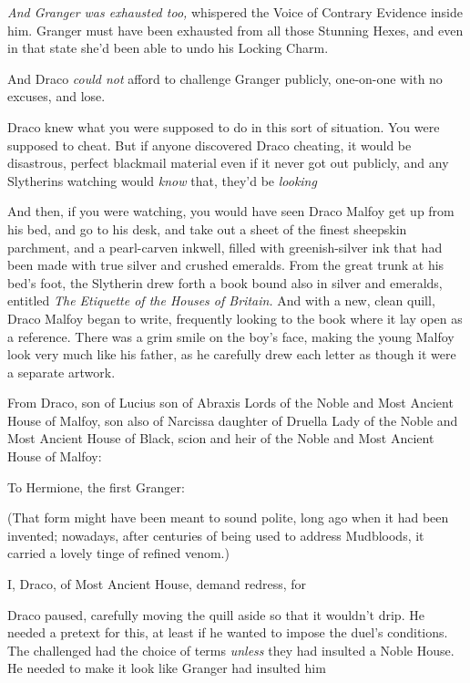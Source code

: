\emph{And Granger was exhausted too,} whispered the Voice of Contrary Evidence
inside him. Granger must have been exhausted from all those Stunning Hexes, and
even in that state she'd been able to undo his Locking Charm.

And Draco \emph{could not} afford to challenge Granger publicly, one-on-one
with no excuses, and lose.

Draco knew what you were supposed to do in this sort of situation. You were
supposed to cheat. But if anyone discovered Draco cheating, it would be
disastrous, perfect blackmail material even if it never got out publicly, and
any Slytherins watching would \emph{know} that, they'd be \emph{looking}{\el}

And then, if you were watching, you would have seen Draco Malfoy get up from
his bed, and go to his desk, and take out a sheet of the finest sheepskin
parchment, and a pearl-carven inkwell, filled with greenish-silver ink that had
been made with true silver and crushed emeralds. From the great trunk at his
bed's foot, the Slytherin drew forth a book bound also in silver and emeralds,
entitled \emph{The Etiquette of the Houses of Britain.} And with a new, clean
quill, Draco Malfoy began to write, frequently looking to the book where it lay
open as a reference. There was a grim smile on the boy's face, making the young
Malfoy look very much like his father, as he carefully drew each letter as
though it were a separate artwork.

\begin{writtenNote}
From Draco, son of Lucius son of Abraxis Lords of the Noble and Most
Ancient House of Malfoy, son also of Narcissa daughter of Druella Lady of the
Noble and Most Ancient House of Black, scion and heir of the Noble and Most
Ancient House of Malfoy:

To Hermione, the first Granger:
\end{writtenNote}

(That form might have been meant to sound polite, long ago when it had been
invented; nowadays, after centuries of being used to address Mudbloods, it
carried a lovely tinge of refined venom.)

\begin{writtenNote}
I, Draco, of Most Ancient House, demand redress, for
\end{writtenNote}

Draco paused, carefully moving the quill aside so that it wouldn't drip. He
needed a pretext for this, at least if he wanted to impose the duel's
conditions. The challenged had the choice of terms \emph{unless} they had
insulted a Noble House. He needed to make it look like Granger had insulted
him{\el}

